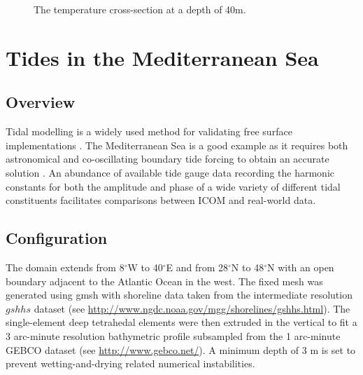 \begin{figure}[h!]
\begin{center}
\caption{The temperature cross-section at a depth of 40m.}
\label{fig:rousset-40m}
\end{center}
\end{figure}





\section{Tides in the Mediterranean Sea}
\label{sect:tides_in_the_med}

\subsection{Overview}

Tidal modelling is a widely used method for validating free surface implementations \citep{Shum1997}. The Mediterranean Sea
is a good example as it requires both astronomical and co-oscillating boundary tide forcing to obtain
an accurate solution \citep{Tsimplis1995, Wells2008}. An abundance of available tide gauge data recording the 
harmonic constants for both the amplitude and phase of a wide variety of different tidal constituents
facilitates comparisons between ICOM and real-world data. 
 

\subsection{Configuration}

The domain extends from 8$^\circ$W to 40$^\circ$E and from 28$^\circ$N to 48$^\circ$N with an open boundary adjacent to the Atlantic
Ocean in the west. The fixed mesh was generated using gmsh with shoreline data taken from the intermediate resolution $gshhs$
dataset (see \url{http://www.ngdc.noaa.gov/mgg/shorelines/gshhs.html}). The single-element deep tetrahedal elements were then
extruded in the vertical to fit a 3 arc-minute resolution bathymetric profile subsampled from the 1 arc-minute GEBCO dataset     
(see \url{http://www.gebco.net/}). A minimum depth of 3 m  is set to prevent wetting-and-drying related numerical instabilities.

